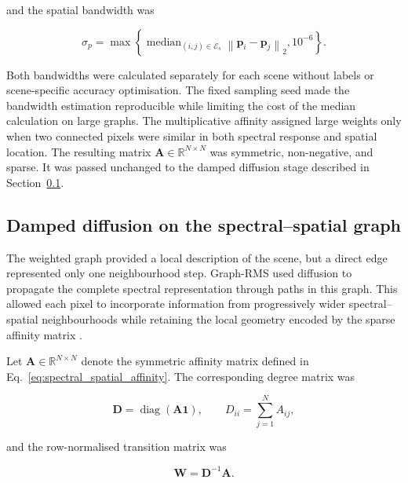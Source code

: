 \documentclass[10pt,a4paper,fleqn]{article}
\begin{document}
and the spatial bandwidth was

\begin{equation}
\sigma_p
=
\max
\left\{
\operatorname{median}_{(i,j)\in\mathcal{E}_{s}}
\left\|
\mathbf{p}_i-\mathbf{p}_j
\right\|_2,
10^{-6}
\right\}.
\label{eq:spatial_bandwidth}
\end{equation}

Both bandwidths were calculated separately for each scene without labels or
scene-specific accuracy optimisation. The fixed sampling seed made the
bandwidth estimation reproducible while limiting the cost of the median
calculation on large graphs. The multiplicative affinity assigned
large weights only when two connected pixels were similar in both spectral
response and spatial location. The resulting matrix
\(\mathbf{A}\in\mathbb{R}^{N\times N}\) was symmetric, non-negative, and
sparse. It was passed unchanged to the damped diffusion stage described in
Section~\ref{subsec:graph_diffusion}.
\subsection{Damped diffusion on the spectral--spatial graph}
\label{subsec:graph_diffusion}

The weighted graph provided a local description of the scene, but a direct
edge represented only one neighbourhood step. Graph-RMS used diffusion to
propagate the complete spectral representation through paths in this graph.
This allowed each pixel to incorporate information from progressively wider
spectral--spatial neighbourhoods while retaining the local geometry encoded by
the sparse affinity matrix \citep{coifman2006,murphy2019}.

Let
\(\mathbf{A}\in\mathbb{R}^{N\times N}\) denote the symmetric affinity matrix
defined in Eq.~\eqref{eq:spectral_spatial_affinity}. The corresponding degree
matrix was

\begin{equation}
\mathbf{D}
=
\operatorname{diag}
\left(
\mathbf{A}\mathbf{1}
\right),
\qquad
D_{ii}
=
\sum_{j=1}^{N}A_{ij},
\label{eq:degree_matrix}
\end{equation}

and the row-normalised transition matrix was

\begin{equation}
\mathbf{W}
=
\mathbf{D}^{-1}\mathbf{A}.
\label{eq:transition_matrix}
\end{equation}
\end{document}
